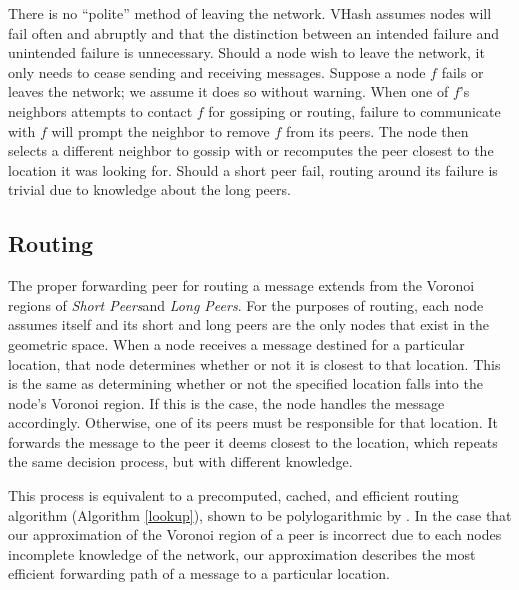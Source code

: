 \documentclass[10pt, conference, letterpaper]{IEEEtran}
\begin{document}
There is no ``polite'' method of leaving the network. 
VHash assumes nodes will fail often and abruptly and that the distinction between an intended failure and unintended failure is unnecessary.
Should a node wish to leave the network, it only needs to cease sending and receiving messages.
Suppose a node $f$ fails or leaves the network; we assume it does so without warning.
When one of $f$'s neighbors attempts to contact $f$ for gossiping or routing, failure to communicate with $f$ will prompt the neighbor to remove $f$ from its peers.  
The node then selects a different neighbor to gossip with or recomputes the peer closest to the location it was looking for. 
Should a short peer fail, routing around its failure is trivial due to knowledge about the long peers.


\subsection{Routing}
The proper forwarding peer for routing a message extends from the Voronoi regions of \textit{Short Peers}and \textit{Long Peers}.
For the purposes of routing, each node assumes itself and its short and long peers are the only nodes that exist in the geometric space.  
When a node receives a message destined for a particular location, that node determines whether or not it is closest to that location.
This is the same as determining whether or not the specified location falls into the node's Voronoi region.
If this is the case, the node handles the message accordingly.  
Otherwise, one of its peers must be responsible for that location.
It forwards the message to the peer it deems closest to the location, which repeats the same decision process, but with different knowledge.

This process is equivalent to a precomputed, cached, and efficient routing algorithm (Algorithm \ref{lookup}), shown to be polylogarithmic by \cite{raynet} \cite{kleinberg2000navigation} \cite{voronet}.
In the case that our approximation of the Voronoi region of a peer is incorrect due to each nodes incomplete knowledge of the network, our approximation describes the most efficient forwarding path of a message to a particular location.
\end{document}
